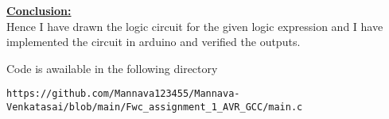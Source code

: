 \documentclass[10pt,a4paper,twocolumn]{report}
\begin{document}
\vspace{5mm}
\raggedright \textbf{\underline{Conclusion:}}\vspace{7mm}
\\ Hence I have drawn the logic circuit for the given logic expression and I have implemented the circuit in arduino and verified the outputs.
\vspace{10mm}
\\ \raggedright Code is awailable in the following directory \\
\begin{lstlisting}
https://github.com/Mannava123455/Mannava-Venkatasai/blob/main/Fwc_assignment_1_AVR_GCC/main.c
\end{lstlisting}
\end{document}
